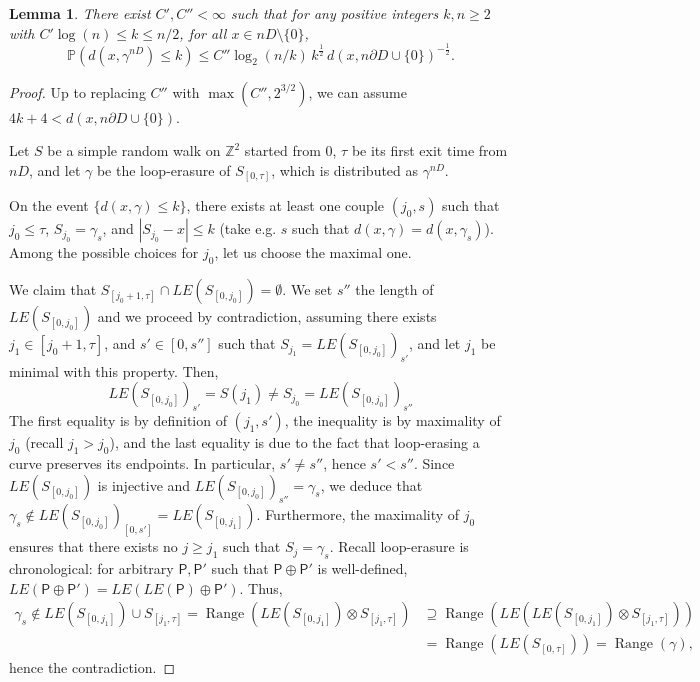 \documentclass[11pt]{article}
\newtheorem{lemma}[theorem]{Lemma}
\DeclareMathOperator{\Range}{Range}
\begin{document}
\begin{lemma}
    \label{le:probbound2}
    There exist $C',C''<\infty$ such that for any positive integers $k,n\geq 2$ with $C'\log(n)\leq k\leq n/2$, for all $x\in n D\setminus\{0\}$,
    \[
    \mathbb{P}( d(x,\gamma^{nD})\leq k  )\leq C'' \log_2(n/k) \, k^\frac{1}{2}\,  d(x, n \partial D \cup \{0\})^{-\frac{1}{2}} .\]
\end{lemma}
\begin{proof}
    Up to replacing $C''$ with $\max(C'',2^{3/2} )$, we can assume $4 k+4<d(x, n\partial D \cup \{0\})$.

    Let $S$ be a simple random walk on $\mathbb{Z}^2$ started from $0$, $\tau$ be its first exit time from $nD$, and let $\gamma$ be the loop-erasure of $S_{[0,\tau]}$, which is distributed as $\gamma^{nD}$.

    On the event $\{d(x,\gamma )\leq k\}$, there exists at least one couple $(j_0,s)$ such that $j_0\leq \tau $, $S_{j_0}=\gamma_s$, and $|S_{j_0}-x|\leq k$ (take e.g. $s$ such that $d(x,\gamma)=d(x,\gamma_s)$). Among the possible choices for $j_0$, let us choose the maximal one.

    We claim that $S_{[j_0+1,\tau]} \cap LE(S_{[0,j_0]})=\emptyset$.
    We set $s''$ the length of $LE(S_{[0,j_0]})$
    and we proceed by contradiction, assuming there exists $j_1\in [j_0+1,\tau]$, and $s'\in [0,s'']$ such that $S_{j_1}=  LE(S_{[0,j_0]})_{s'}$, and let $j_1$ be minimal with this property.
    Then,
    \[LE(S_{[0,j_0]})_{s'}=S(j_1)\neq
    S_{j_0}=LE(S_{[0,j_0]})_{s''}
    \]
The first equality is by definition of $(j_1,s')$, the inequality is by maximality of $j_0$ (recall $j_1>j_0$), and the last equality is due to the fact that loop-erasing a curve preserves its endpoints.
In particular, $s'\neq s''$, hence $s'<s''$. Since
$LE(S_{[0,j_0]})$ is injective and $ LE(S_{[0,j_0]})_{s''}=\gamma_s$, we deduce that $\gamma_s\notin LE(S_{[0,j_0]})_{[0,s']}=LE(S_{[0,j_1]})$. Furthermore, the maximality of $j_0$ ensures that there exists no $j\geq j_1$ such that $S_j=\gamma_s$. Recall loop-erasure is chronological: for arbitrary $\mathsf{P}, \mathsf{P}'$ such that $\mathsf{P}\oplus \mathsf{P}'$ is well-defined, $LE(\mathsf{P}\oplus \mathsf{P}')= LE( LE(\mathsf{P})\oplus \mathsf{P}')$.
Thus,
\begin{align*}
\gamma_s\notin LE(S_{[0,j_1]}) \cup S_{[j_1,\tau]}
=\Range(  LE(S_{[0,j_1]}) \otimes S_{[j_1,\tau]})
&\supseteq
\Range( LE(  LE(S_{[0,j_1]}) \otimes S_{[j_1,\tau]}) )\\
&=\Range(LE(S_{[0,\tau]})) =\Range(\gamma),
\end{align*}
hence the contradiction.


\end{proof}
\end{document}
